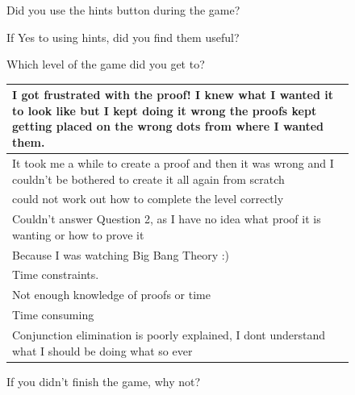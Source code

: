 \begin{figure}[H]
\caption{Did you use the hints button during the game?}
\end{figure}

\begin{figure}[H]
\caption{If Yes to using hints, did you find them useful?}
\end{figure}

\begin{figure}[H]
\caption{Which level of the game did you get to?}
\end{figure}

\begin{figure}[H]
\begin{tabular}{|p{12cm}|} 
\hline
I got frustrated with the proof! I knew what I wanted it to look like but I kept doing it wrong the proofs kept getting placed on the wrong dots from where I wanted them. \\
\hline
It took me a while to create a proof and then it was wrong and I couldn't be bothered to create it all again from scratch \\
\hline
could not work out how to complete the level correctly \\
\hline
Couldn't answer Question 2, as I have no idea what proof it is wanting or how to prove it \\
\hline
Because I was watching Big Bang Theory :) \\
\hline
Time constraints. \\
\hline
Not enough knowledge of proofs or time \\
\hline
Time consuming \\
\hline
Conjunction elimination is poorly explained, I dont understand what I should be doing what so ever \\
\hline
\end{tabular}
\caption{If you didn't finish the game, why not?}
\end{figure}

